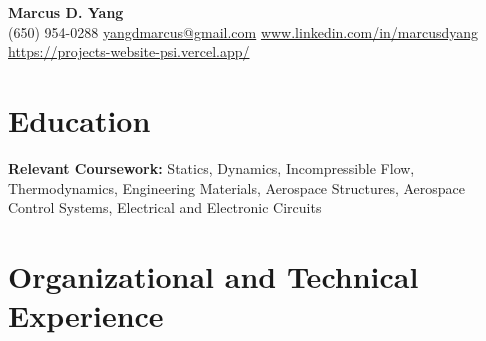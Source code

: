 \newcommand{\entrygap}{\vspace{2pt}}



\begin{center}
  {\fontsize{17}{20}\selectfont\bfseries Marcus D. Yang}\\[2pt]
  {\footnotesize (650) 954-0288 \textbar{} \href{mailto:yangdmarcus@gmail.com}{yangdmarcus@gmail.com} \textbar{} \href{https://www.linkedin.com/in/marcusdyang}{www.linkedin.com/in/marcusdyang} \textbar{} \href{https://projects-website-psi.vercel.app/}{https://projects-website-psi.vercel.app/}}
\end{center}

\section{Education}
\textbf{Relevant Coursework:} Statics, Dynamics, Incompressible Flow, Thermodynamics, Engineering Materials, Aerospace Structures, Aerospace Control Systems, Electrical and Electronic Circuits

\section{Organizational and Technical Experience}

